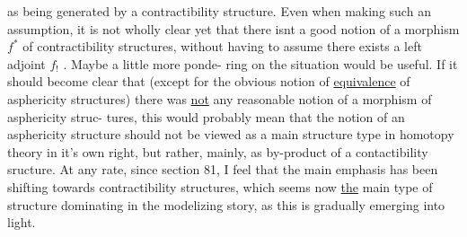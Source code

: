 as  being generated by a contractibility structure.  Even when making
such an assumption,  it is not wholly clear yet that there isnt a good
notion of a morphism $f^{*}$ of contractibility structures,  without having
to assume there exists a left adjoint $f_{!}$ .  Maybe a little more ponde-%
ring on the situation would be useful.  If it should become clear that
(except for the obvious notion of \uline{equivalence} of asphericity structures)
there was \uline{not} any reasonable notion of a morphism of asphericity struc-%
tures,  this would probably mean that the notion of an asphericity
structure should not be viewed as a main structure type in homotopy
theory in it's own right,  but rather,  mainly,  as   by-product 
 of a contactibility sructure.  At any rate,
since section 81,  I feel that the main emphasis has  been shifting
towards contractibility structures,  which seems now \uline{the} main type of
structure dominating  in the modelizing story,  as this  is gradually
emerging into light.

